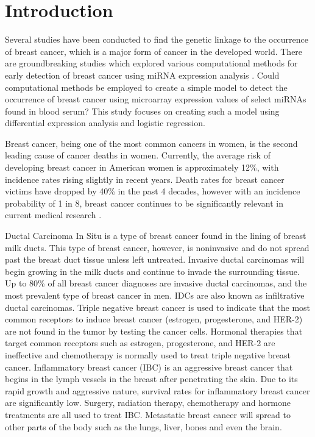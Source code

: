 \documentclass{bioinfo}
\begin{document}
\section{Introduction}
Several studies have been conducted to find the genetic linkage to the occurrence of breast cancer, which is a major form of cancer in the developed world. There are groundbreaking studies which explored various computational methods for early detection of breast cancer using miRNA expression analysis \cite{shimomura}. Could computational methods be employed to create a simple model to detect the occurrence of breast cancer using microarray expression values of select miRNAs found in blood serum? This study focuses on creating such a model using differential expression analysis and logistic regression.

Breast cancer, being one of the most common cancers in women, is the second leading cause of cancer deaths in women. Currently, the average risk of developing breast cancer in American women is approximately 12\%, with incidence rates rising slightly in recent years. Death rates for breast cancer victims have dropped by 40\% in the past 4 decades, however with an incidence probability of 1 in 8, breast cancer continues to be significantly relevant in current medical research \cite{breast-cancer}. 

Ductal Carcinoma In Situ is a type of breast cancer found in the lining of breast milk ducts. This type of breast cancer, however, is noninvasive and do not spread past the breast duct tissue unless left untreated. Invasive ductal carcinomas will begin growing in the milk ducts and continue to invade the surrounding tissue. Up to 80\% of all breast cancer diagnoses are invasive ductal carcinomas, and the most prevalent type of breast cancer in men. IDCs are also known as infiltrative ductal carcinomas. Triple negative breast cancer is used to indicate that the most common receptors to induce breast cancer  (estrogen, progesterone, and HER-2) are not found in the tumor by testing the cancer cells. Hormonal therapies that  target common receptors such as estrogen, progesterone, and HER-2 are ineffective and chemotherapy is normally used to treat triple negative breast cancer. Inflammatory breast cancer (IBC) is an aggressive breast cancer that begins in the lymph vessels in the breast after penetrating the skin. Due to its rapid growth and aggressive nature, survival rates for inflammatory breast cancer are significantly low. Surgery, radiation therapy, chemotherapy and hormone treatments are all used to treat IBC. Metastatic breast cancer will spread to other parts of the body such as the lungs, liver, bones and even the brain. 
\end{document}
